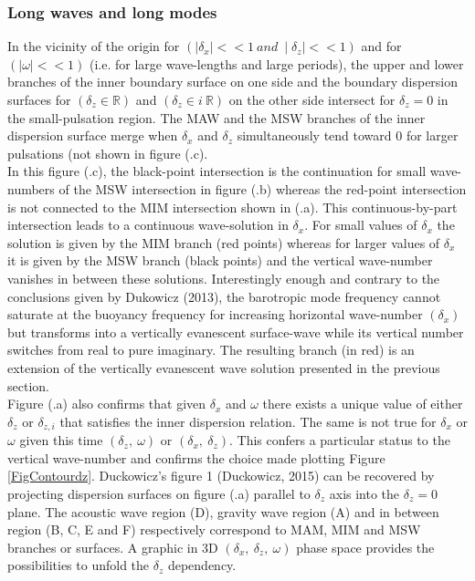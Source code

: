 \documentclass[a4paper,11pt]{article}
\begin{document}
\subsubsection{Long waves and long modes}
In the vicinity of the origin for  $(\mid\delta_x\mid <<1\  and\ \mid\delta_z\mid << 1)$ and for $(\mid\omega\mid <<1)$ (i.e. for large wave-lengths and large periods), the upper and lower branches of the inner boundary surface on one side and the boundary dispersion surfaces for $(\delta_z\in\mathbb{R})$ and $(\delta_z\in i\ \mathbb{R})$ on the other side intersect for $\delta_z=0$ in the small-pulsation region. The MAW and the MSW branches of the inner dispersion surface merge when $\delta_x$ and $\delta_z$ simultaneously tend toward 0 for larger pulsations (not shown in figure (.c).\\
In this figure (.c), the black-point intersection is the continuation for small wave-numbers of the MSW intersection in figure (.b) whereas the red-point intersection is not connected to the MIM intersection shown in (.a). This continuous-by-part intersection leads to a continuous wave-solution in $\delta_x$. For small values of $\delta_x$ the solution is given by the MIM branch (red points) whereas for larger values of $\delta_x$ it is given by the MSW branch (black points) and the vertical wave-number vanishes in between these solutions. Interestingly enough and contrary to the conclusions given by Dukowicz (2013), the barotropic mode frequency cannot saturate at the buoyancy frequency for increasing horizontal wave-number $(\delta_x)$ but transforms into a vertically evanescent surface-wave while its vertical number switches from real to pure imaginary. The resulting branch (in red) is an extension of the vertically evanescent wave solution presented in the previous section.\\
Figure (.a) also confirms that given $\delta_x$ and $\omega$ there exists a unique value of either $\delta_z$ or $\delta_{z,i}$ that satisfies the inner dispersion relation. The same is not true for $\delta_x$ or $\omega$ given this time $(\delta_z,\ \omega)$ or $(\delta_x,\ \delta_z)$. This confers a particular status to the vertical wave-number and confirms the choice made plotting Figure \ref{FigContourdz}. Duckowicz's figure 1 (Duckowicz, 2015) can be recovered by projecting dispersion surfaces on figure (.a) parallel to $\delta_z$ axis into the $\delta_z=0$ plane. The acoustic wave region (D), gravity wave region (A) and in between region (B, C, E and F) respectively correspond to MAM, MIM and MSW branches or surfaces. A graphic in 3D $(\delta_x,\ \delta_z,\ \omega)$ phase space provides the possibilities to unfold the $\delta_z$ dependency. 
\end{document}

